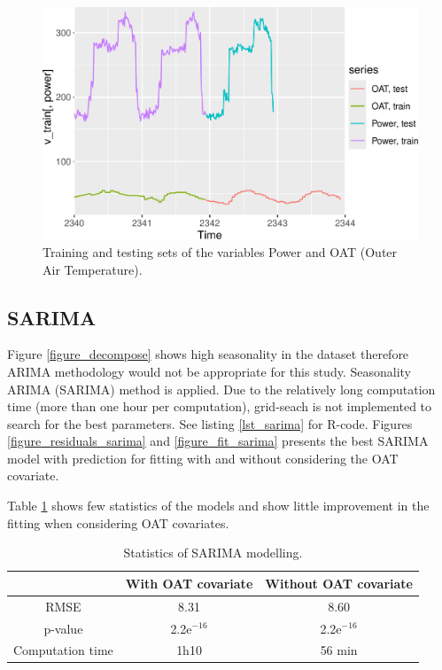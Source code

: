 \begin{figure}[H]
\centering
 \includegraphics[scale=0.65]{figures/train_test_set.png}
\caption{Training and testing sets of the variables Power and OAT (Outer Air Temperature).}
\label{figure_train_test_set}
\end{figure}


\subsection{SARIMA}
Figure \ref{figure_decompose} shows high seasonality in the dataset therefore ARIMA methodology 
would not be appropriate for this study. Seasonality ARIMA (SARIMA) method is applied. Due to the 
relatively long computation time (more than one hour per computation), grid-seach is not implemented 
to search for the best parameters. See listing \ref{lst_sarima} for R-code. Figures 
\ref{figure_residuals_sarima} and \ref{figure_fit_sarima} presents the best SARIMA model with 
prediction for fitting with and without considering the OAT covariate.

Table \ref{table_sarima} shows few statistics of the models and show little improvement in the 
fitting when considering OAT covariates.

\begin{table}[H]
\centering \begin{tabular}{c|cc}
                 & With OAT covariate & Without OAT covariate\\\hline\hline
RMSE             &  8.31     &  8.60 \\
p-value          & 2.2e$^{-16}$ &  2.2e$^{-16}$ \\
Computation time &  1h10     &  56 min \\
\end{tabular}
\caption{Statistics of SARIMA modelling.}
\label{table_sarima}
\end{table}

